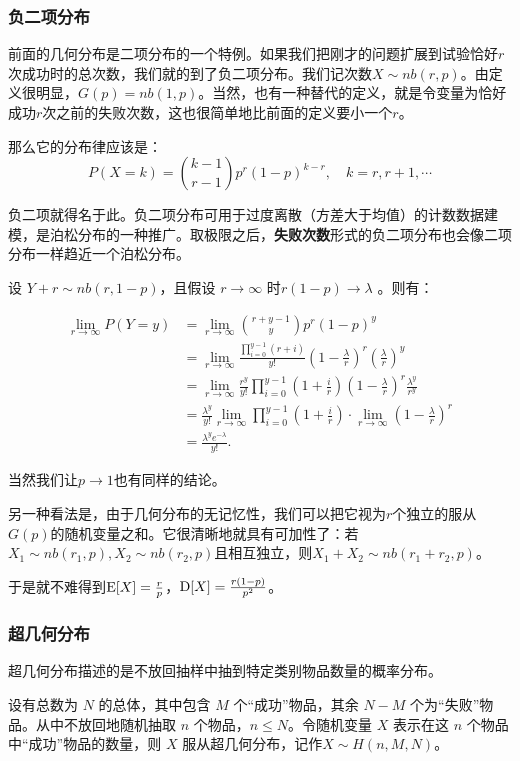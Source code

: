 \subsubsection{负二项分布}
前面的几何分布是二项分布的一个特例。如果我们把刚才的问题扩展到试验恰好$r$次成功时的总次数，我们就的到了负二项分布。我们记次数$X\sim nb(r,p)$。由定义很明显，$G(p)=nb(1,p)$。当然，也有一种替代的定义，就是令变量为恰好成功$r$次之前的失败次数，这也很简单地比前面的定义要小一个$r$。

那么它的分布律应该是：
\[
P(X=k)=\binom{k-1}{r-1}p^{r}(1-p)^{k-r},\quad k=r,r+1,\cdots
\]

负二项就得名于此。负二项分布可用于过度离散（方差大于均值）的计数数据建模，是泊松分布的一种推广。取极限之后，\textbf{失败次数}形式的负二项分布也会像二项分布一样趋近一个泊松分布。

设 $Y + r \sim nb\left(r, 1 - p\right)$，且假设 \( r \to \infty \) 时\( r(1-p) \to \lambda \) 。则有：

\begin{align*}
\lim_{r\to\infty} P(Y=y) 
&= \lim_{r\to\infty} \binom{r+y-1}{y} p^r (1-p)^y \\
&= \lim_{r\to\infty} \frac{\prod_{i=0}^{y-1}(r+i)}{y!} 
   \left(1-\frac{\lambda}{r}\right)^r \left(\frac{\lambda}{r}\right)^y  \\
&= \lim_{r\to\infty} \frac{r^y}{y!} 
   \prod_{i=0}^{y-1}\left(1+\frac{i}{r}\right)
   \left(1-\frac{\lambda}{r}\right)^r \frac{\lambda^y}{r^y} \\
&= \frac{\lambda^y}{y!} \lim_{r\to\infty} 
   \prod_{i=0}^{y-1}\left(1+\frac{i}{r}\right)
   \cdot \lim_{r\to\infty} \left(1-\frac{\lambda}{r}\right)^r \\
&= \frac{\lambda^y e^{-\lambda}}{y!}.
\end{align*}

当然我们让$p\to 1$也有同样的结论。

另一种看法是，由于几何分布的无记忆性，我们可以把它视为$r$个独立的服从$G(p)$的随机变量之和。它很清晰地就具有可加性了：若$X_1\sim nb(r_1,p), X_2\sim nb(r_2,p)$且相互独立，则$X_1+X_2 \sim nb(r_1+r_2,p)$。

于是就不难得到$\operatorname{E}[X]=\frac rp$，$\operatorname{D}[X]=\frac{r(1-p)}{p^2}$。

\subsubsection{超几何分布}
超几何分布描述的是不放回抽样中抽到特定类别物品数量的概率分布。

设有总数为 $N$ 的总体，其中包含 $M$ 个“成功”物品，其余 $N−M$ 个为“失败”物品。从中不放回地随机抽取 $n$ 个物品，$n\leq N$。令随机变量 $X$ 表示在这 $n$ 个物品中“成功”物品的数量，则 $X$ 服从超几何分布，记作$X\sim H(n,M,N)$。

